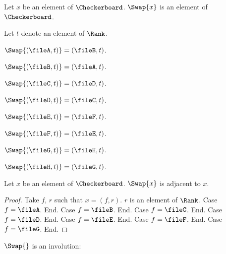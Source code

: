\begin{forthel}
    \begin{signature}
        Let $x$ be an element of $\Checkerboard$.
        $\Swap{x}$ is an element of $\Checkerboard$.
    \end{signature}

    Let $t$ denote an element of $\Rank$.

    \begin{axiom} $\Swap{(\fileA, t)} = (\fileB, t)$. \end{axiom}
    \begin{axiom} $\Swap{(\fileB, t)} = (\fileA, t)$. \end{axiom}

    \begin{axiom} $\Swap{(\fileC, t)} = (\fileD, t)$. \end{axiom}
    \begin{axiom} $\Swap{(\fileD, t)} = (\fileC, t)$. \end{axiom}

    \begin{axiom} $\Swap{(\fileE, t)} = (\fileF, t)$. \end{axiom}
    \begin{axiom} $\Swap{(\fileF, t)} = (\fileE, t)$. \end{axiom}

    \begin{axiom} $\Swap{(\fileG, t)} = (\fileH, t)$. \end{axiom}
    \begin{axiom} $\Swap{(\fileH, t)} = (\fileG, t)$. \end{axiom}

    \begin{lemma}
        Let $x$ be an element of $\Checkerboard$.
        $\Swap{x}$ is adjacent to $x$.
    \end{lemma}
    \begin{proof}
        Take $f$, $r$ such that $x = (f, r)$.
        $r$ is an element of $\Rank$.
        Case $f = \fileA$. End.
        Case $f = \fileB$. End.
        Case $f = \fileC$. End.
        Case $f = \fileD$. End.
        Case $f = \fileE$. End.
        Case $f = \fileF$. End.
        Case $f = \fileG$. End.
    \end{proof}
\end{forthel}

$\Swap{}$ is an involution:


